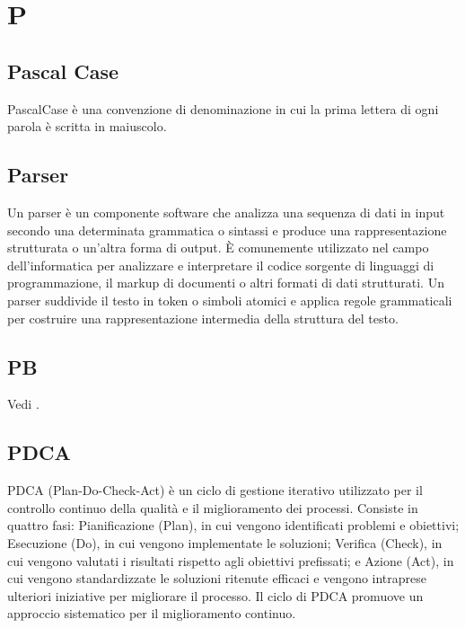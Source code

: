 \section{P}

\vspace{2em}
\subsection*{Pascal Case}
\par PascalCase è una convenzione di denominazione in cui la prima lettera di ogni parola è scritta in maiuscolo.

\vspace{2em}
\subsection*{Parser}
\par Un parser è un componente software che analizza una sequenza di dati in input secondo una determinata grammatica o sintassi e produce una rappresentazione strutturata o un'altra forma di output. È comunemente utilizzato nel campo dell'informatica per analizzare e interpretare il codice sorgente di linguaggi di programmazione, il markup di documenti o altri formati di dati strutturati. Un parser suddivide il testo in token o simboli atomici e applica regole grammaticali per costruire una rappresentazione intermedia della struttura del testo.

\vspace{2em}
\subsection*{PB}
\par Vedi .

\vspace{2em}
\subsection*{PDCA}
\par PDCA (Plan-Do-Check-Act) è un ciclo di gestione iterativo utilizzato per il controllo continuo della qualità e il miglioramento dei processi. Consiste in quattro fasi: Pianificazione (Plan), in cui vengono identificati problemi e obiettivi; Esecuzione (Do), in cui vengono implementate le soluzioni; Verifica (Check), in cui vengono valutati i risultati rispetto agli obiettivi prefissati; e Azione (Act), in cui vengono standardizzate le soluzioni ritenute efficaci e vengono intraprese ulteriori iniziative per migliorare il processo. Il ciclo di PDCA promuove un approccio sistematico per il miglioramento continuo.

